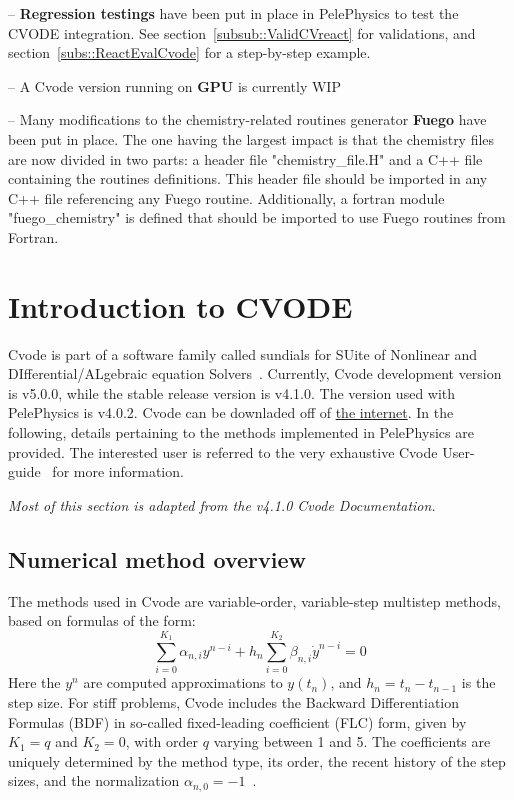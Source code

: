\documentclass[12pt]{article}
\begin{document}
-- \textbf{Regression testings} have been put in place in PelePhysics to test the CVODE integration. See section~\ref{subsub::ValidCVreact} for validations, and section~\ref{subs::ReactEvalCvode} for a step-by-step example.

-- A Cvode version running on \textbf{GPU} is currently WIP

-- Many modifications to the chemistry-related routines generator \textbf{Fuego} have been put in place. The one having the largest impact is that the chemistry files are now divided in two parts: a header file "chemistry_file.H" and a C++ file containing the routines definitions. This header file should be imported in any C++ file referencing any Fuego routine. Additionally, a fortran module "fuego_chemistry" is defined that should be imported to use Fuego routines from Fortran.

\section{Introduction to CVODE}
Cvode is part of a software family called sundials for SUite of Nonlinear and DIfferential/ALgebraic equation Solvers~\cite{hindmarsh2005sundials}. Currently, Cvode development version is v5.0.0, while the stable release version is v4.1.0. The version used with PelePhysics is v4.0.2. Cvode can be downladed off of \href{https://computation.llnl.gov/projects/sundials/sundials-software}{the internet}. In the following, details pertaining to the methods implemented in PelePhysics are provided. The interested user is referred to the very exhaustive Cvode User-guide~\cite{CVODE:2019} for more information.

\textit{Most of this section is adapted from the v4.1.0 Cvode Documentation.}

\subsection{Numerical method overview}

The methods used in Cvode are variable-order, variable-step multistep methods, based on formulas of the form:
\begin{equation}
\sum_{i=0}^{K_1} \alpha_{n,i} y^{n-i} + h_n \sum_{i=0}^{K_2} \beta_{n,i} \dot{y}^{n-i} = 0 
\end{equation}
Here the $y^n$ are computed approximations to $y(t_n)$, and $h_n = t_n-t_{n-1}$ is the step size. For stiff problems, Cvode includes the Backward Differentiation Formulas (BDF) in so-called fixed-leading coefficient (FLC) form, given by $K_1=q$ and $K_2= 0$, with order $q$ varying between 1 and 5.  The coefficients are uniquely determined by the method type, its order, the recent history of the step sizes, and the normalization $\alpha_{n,0}=-1$~\cite{byrne1975polyalgorithm,jackson1980alternative}.  
\end{document}

